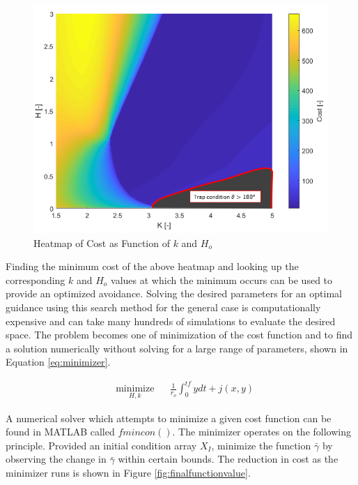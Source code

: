 \documentclass[numbered,pdftex]{ohio-etd}
\begin{document}
\begin{figure}[H]
	\centering
	\includegraphics[trim=0 0 0 10,clip,width=16cm]{PaperFigures/Methods/costHandRwithTrap.png}
	\caption{Heatmap of Cost as Function of $k$ and $H_o$}
	\label{fig:costHandR}
\end{figure}

Finding the minimum cost of the above heatmap and looking up the corresponding $k$ and $H_o$ values at which the minimum occurs can be used to provide an optimized avoidance. Solving the desired parameters for an optimal guidance using this search method for the general case is computationally expensive and can take many hundreds of simulations to evaluate the desired space. The problem becomes one of minimization of the cost function and to find a solution numerically without solving for a large range of parameters, shown in Equation \ref{eq:minimizer}.

\begin{equation}
\label{eq:minimizer}
\begin{aligned}
& \underset{H,k}{\text{minimize}}
& & \frac{1}{r_o}\int_{0}^{tf}ydt + j(x,y) 
\end{aligned}
\end{equation}

A numerical solver which attempts to minimize a given cost function can be found in MATLAB called $fmincon()$. The minimizer operates on the following principle. Provided an initial condition array $X_I$, minimize the function $\bar{\gamma}$ by observing the change in $\bar{\gamma}$ within certain bounds. The reduction in cost as the minimizer runs is shown in Figure \ref{fig:finalfunctionvalue}.
\end{document}

